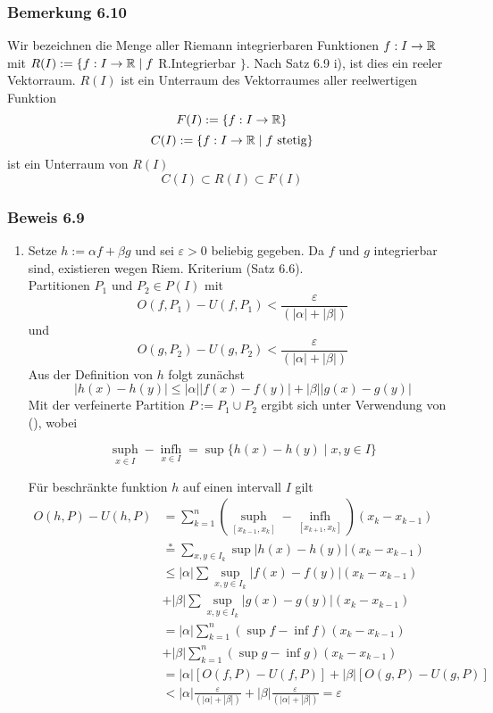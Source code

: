 \subsubsection*{Bemerkung 6.10}
Wir bezeichnen die Menge aller Riemann integrierbaren Funktionen $f:I\to \mathbb{R}$ mit $R(I):=\{f:I\to\mathbb{R}\mid f$ R.Integrierbar $\}$. Nach Satz 6.9 i), ist dies ein reeler Vektorraum. $R(I)$ ist ein Unterraum des Vektorraumes aller reelwertigen Funktion \[F(I):=\{ f:I\to \mathbb{R}\}\]
\[C(I):=\{ f:I\to\mathbb{R}\mid f \text{ stetig}\}\]
ist ein Unterraum von $R(I)$ \[C(I)\subset R(I)\subset F(I)\]
\subsubsection*{Beweis 6.9}
\begin{enumerate}
\item Setze $h:=\alpha f + \beta g$ und sei $\varepsilon>0$ beliebig gegeben. Da $f$ und $g$ integrierbar sind, existieren wegen Riem. Kriterium (Satz 6.6).\\ Partitionen $P_1$ und $P_2 \in P(I)$ mit \[O(f,{P_1}) - U(f,{P_1}) < \frac{\varepsilon }{{(\left| \alpha  \right| + \left| \beta  \right|)}}\] und  \[O(g,{P_2}) - U(g,{P_2}) < \frac{\varepsilon }{{(\left| \alpha  \right| + \left| \beta  \right|)}}\] Aus der Definition von $h$ folgt zunächst \[\left| {h(x) - h(y)} \right| \le \left| \alpha  \right|\left| {f(x) - f(y)} \right| + \left| \beta  \right|\left| {g(x) - g(y)} \right|\] Mit der verfeinerte Partition $P:=P_1\cup P_2$ ergibt sich unter Verwendung von (\textasteriskcentered), wobei 


\[
\mathop {\sup h(x)}\limits_{x \in I}  - \mathop {\inf h(x)}\limits_{x \in I}  = \sup \{ h(x) - h(y)\mid x,y \in I\}\tag{\textasteriskcentered}
\] 

Für beschränkte funktion $h$ auf einen intervall $I$ gilt
\begin{align*}
O(h,P) - U(h,P)&=\sum\limits_{k = 1}^n {(\mathop {\sup h}\limits_{[{x_{k - 1}},{x_k}]}  - \mathop {\inf h}\limits_{[{x_{k + 1}},{x_k}]} )({x_k} - {x_{k - 1}})} \\
&\mathop  =\limits^ *  \sum\limits_{x,y \in {I_k}} {\sup \left| {h(x) - h(y)} \right|({x_k} - {x_{k - 1}})}\\ 
&\le \left| \alpha  \right|\sum {\mathop {\sup }\limits_{x,y \in {I_k}} \left| {f(x) - f(y)} \right|({x_k} - {x_{k - 1}})}\\
&+ \left| \beta  \right|\sum {\mathop {\sup }\limits_{x,y \in {I_k}} \left| {g(x) - g(y)} \right|({x_k} - {x_{k - 1}})} \\
&= \left| \alpha  \right|\sum\limits_{k = 1}^n {(\sup f - \inf f)({x_k} - {x_{k - 1}})} \\
&+ \left| \beta  \right|\sum\limits_{k = 1}^n {(\sup g - \inf g)({x_k} - {x_{k - 1}})} \\
&=\left| \alpha  \right|[O(f,P) - U(f,P)] + \left| \beta  \right|[O(g,P) - U(g,P)]\\
&< \left| \alpha  \right|\frac{\varepsilon }{{(\left| \alpha  \right| + \left| \beta  \right|)}} + \left| \beta  \right|\frac{\varepsilon }{{(\left| \alpha  \right| + \left| \beta  \right|)}} = \varepsilon 
\end{align*}


\end{enumerate}
